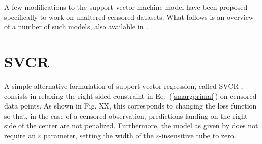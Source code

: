 \documentclass[12pt]{report}
\begin{document}
A few modifications to the support vector machine model have been proposed specifically to work on unaltered censored datasets. What follows is an overview of a number of such models, also available in \cite{vanbelle11}.

\section{SVCR}
A simple alternative formulation of support vector regression, called SVCR \cite{shivaswamy07}, consists in relaxing the right-sided constraint in Eq.\ (\ref{smargprimal}) on censored data points. As shown in Fig. XX, this corresponds to changing the loss function so that, in the case of a censored observation, predictions landing on the right side of the center are not penalized. Furthermore, the model as given by \cite{vanbelle11} does not require an $\varepsilon$ parameter, setting the width of the $\varepsilon$-insensitive tube to zero.
\end{document}
